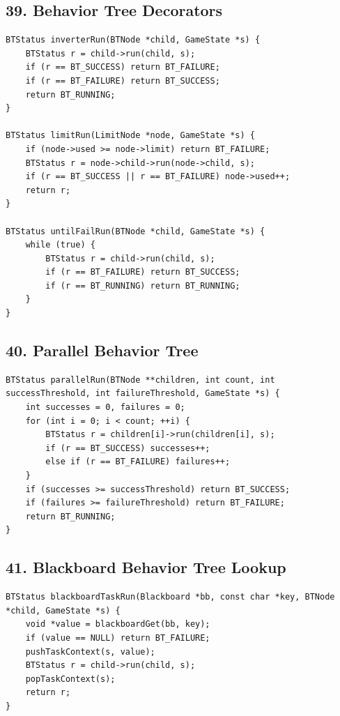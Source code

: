 \documentclass[10pt,letterpaper]{article}
\begin{document}
\subsection*{39. Behavior Tree Decorators}
{}

\begin{verbatim}
BTStatus inverterRun(BTNode *child, GameState *s) {
    BTStatus r = child->run(child, s);
    if (r == BT_SUCCESS) return BT_FAILURE;
    if (r == BT_FAILURE) return BT_SUCCESS;
    return BT_RUNNING;
}

BTStatus limitRun(LimitNode *node, GameState *s) {
    if (node->used >= node->limit) return BT_FAILURE;
    BTStatus r = node->child->run(node->child, s);
    if (r == BT_SUCCESS || r == BT_FAILURE) node->used++;
    return r;
}

BTStatus untilFailRun(BTNode *child, GameState *s) {
    while (true) {
        BTStatus r = child->run(child, s);
        if (r == BT_FAILURE) return BT_SUCCESS;
        if (r == BT_RUNNING) return BT_RUNNING;
    }
}
\end{verbatim}

\subsection*{40. Parallel Behavior Tree}
{}

\begin{verbatim}
BTStatus parallelRun(BTNode **children, int count, int successThreshold, int failureThreshold, GameState *s) {
    int successes = 0, failures = 0;
    for (int i = 0; i < count; ++i) {
        BTStatus r = children[i]->run(children[i], s);
        if (r == BT_SUCCESS) successes++;
        else if (r == BT_FAILURE) failures++;
    }
    if (successes >= successThreshold) return BT_SUCCESS;
    if (failures >= failureThreshold) return BT_FAILURE;
    return BT_RUNNING;
}
\end{verbatim}

\subsection*{41. Blackboard Behavior Tree Lookup}
{}

\begin{verbatim}
BTStatus blackboardTaskRun(Blackboard *bb, const char *key, BTNode *child, GameState *s) {
    void *value = blackboardGet(bb, key);
    if (value == NULL) return BT_FAILURE;
    pushTaskContext(s, value);
    BTStatus r = child->run(child, s);
    popTaskContext(s);
    return r;
}
\end{verbatim}
\end{document}
